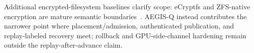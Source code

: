 Additional encrypted-filesystem baselines clarify scope: eCryptfs and ZFS-native encryption are mature semantic boundaries~\cite{ecryptfs, zfs_encryption}.  AEGIS-Q instead contributes the narrower point where placement/admission, authenticated publication, and replay-labeled recovery meet; rollback and GPU-side-channel hardening remain outside the replay-after-advance claim.

